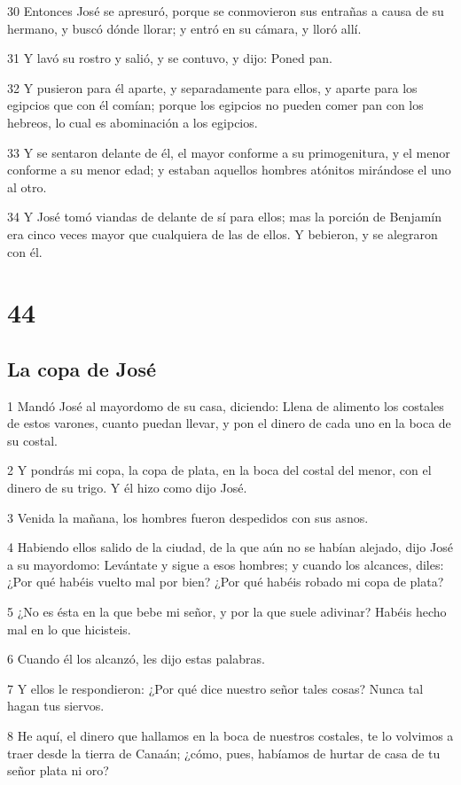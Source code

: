 30 Entonces José se apresuró, porque se conmovieron sus entrañas a causa de su hermano, y buscó dónde llorar; y entró en su cámara, y lloró allí.

31 Y lavó su rostro y salió, y se contuvo, y dijo: Poned pan.

32 Y pusieron para él aparte, y separadamente para ellos, y aparte para los egipcios que con él comían; porque los egipcios no pueden comer pan con los hebreos, lo cual es abominación a los egipcios.

33 Y se sentaron delante de él, el mayor conforme a su primogenitura, y el menor conforme a su menor edad; y estaban aquellos hombres atónitos mirándose el uno al otro.

34 Y José tomó viandas de delante de sí para ellos; mas la porción de Benjamín era cinco veces mayor que cualquiera de las de ellos. Y bebieron, y se alegraron con él.

\chapter{44}

\section{La copa de José}

1 Mandó José al mayordomo de su casa, diciendo: Llena de alimento los costales de estos varones, cuanto puedan llevar, y pon el dinero de cada uno en la boca de su costal.

2 Y pondrás mi copa, la copa de plata, en la boca del costal del menor, con el dinero de su trigo. Y él hizo como dijo José.

3 Venida la mañana, los hombres fueron despedidos con sus asnos.

4 Habiendo ellos salido de la ciudad, de la que aún no se habían alejado, dijo José a su mayordomo: Levántate y sigue a esos hombres; y cuando los alcances, diles: ¿Por qué habéis vuelto mal por bien? ¿Por qué habéis robado mi copa de plata?

5 ¿No es ésta en la que bebe mi señor, y por la que suele adivinar? Habéis hecho mal en lo que hicisteis.

6 Cuando él los alcanzó, les dijo estas palabras.

7 Y ellos le respondieron: ¿Por qué dice nuestro señor tales cosas? Nunca tal hagan tus siervos.

8 He aquí, el dinero que hallamos en la boca de nuestros costales, te lo volvimos a traer desde la tierra de Canaán; ¿cómo, pues, habíamos de hurtar de casa de tu señor plata ni oro?

